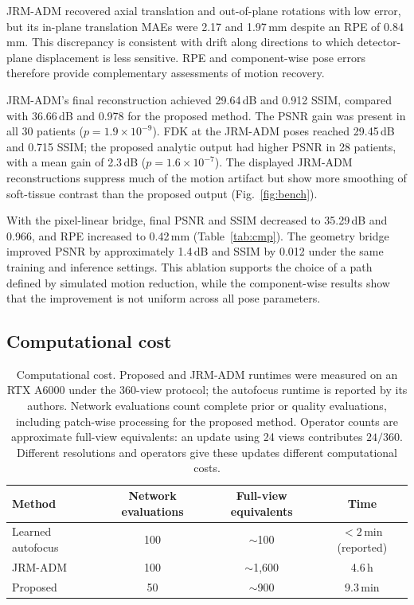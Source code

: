\documentclass[11pt]{article}
\begin{document}
JRM-ADM recovered axial translation and out-of-plane rotations with low error, but
its in-plane translation MAEs were 2.17 and 1.97\,mm despite an RPE of 0.84\,mm.
This discrepancy is consistent with drift along directions to which detector-plane
displacement is less sensitive. RPE and component-wise pose errors therefore provide
complementary assessments of motion recovery.

JRM-ADM's final reconstruction achieved 29.64\,dB and 0.912 SSIM, compared with
36.66\,dB and 0.978 for the proposed method. The PSNR gain was present in all
30 patients ($p=1.9\times10^{-9}$). FDK at the JRM-ADM poses reached
29.45\,dB and 0.715 SSIM; the proposed analytic output had higher PSNR in 28
patients, with a mean gain of 2.3\,dB ($p=1.6\times10^{-7}$).
The displayed JRM-ADM reconstructions suppress much of the motion artifact but show
more smoothing of soft-tissue contrast than the proposed output
(Fig.~\ref{fig:bench}).

With the pixel-linear bridge, final PSNR and SSIM decreased to 35.29\,dB and 0.966,
and RPE increased to 0.42\,mm (Table~\ref{tab:cmp}). The geometry bridge improved
PSNR by approximately 1.4\,dB and SSIM by 0.012 under the same training and inference
settings. This ablation supports the choice of a path defined by simulated motion
reduction, while the component-wise results show that the improvement is not uniform
across all pose parameters.

\FloatBarrier
\subsection{Computational cost}
\label{sec:cost}

\begin{table}[H]
\centering
\caption{Computational cost. Proposed and JRM-ADM runtimes were measured on an RTX A6000
under the 360-view protocol; the autofocus runtime is reported by its authors.
Network evaluations count complete prior or quality evaluations, including patch-wise
processing for the proposed method. Operator counts are approximate full-view
equivalents: an update using 24 views contributes $24/360$. Different resolutions and
operators give these updates different computational costs.}

\label{tab:cost}
\small
\begin{tabular}{lccc}
\toprule
Method & Network evaluations & Full-view equivalents & Time \\
\midrule
Learned autofocus~\cite{thies25} & 100 & $\sim$100 & $<2$\,min (reported) \\
JRM-ADM~\cite{depaepe25} & 100 & $\sim$1{,}600 & 4.6\,h \\
Proposed & 50 & $\sim$900 & 9.3\,min \\
\bottomrule
\end{tabular}
\end{table}
\end{document}
